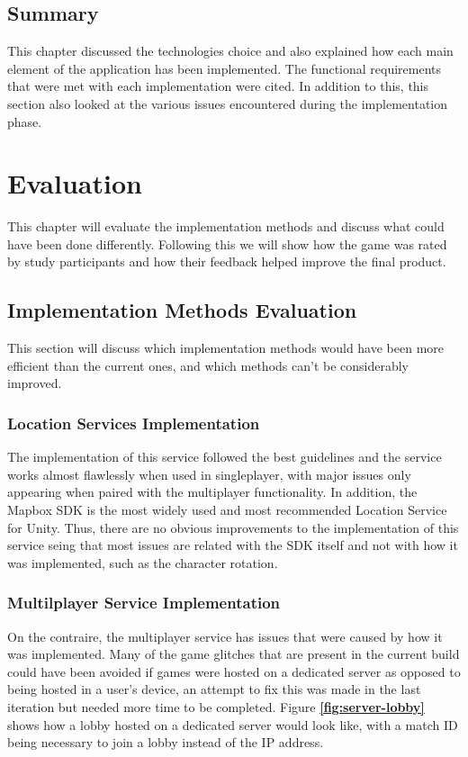 \documentclass{dissertation}
\begin{document}
\section{Summary}
This chapter discussed the technologies choice and also explained how each main element of the application has been implemented. The functional requirements that were met with each implementation were cited. In addition to this, this section also looked at the various issues encountered during the implementation phase.

\chapter{Evaluation}

This chapter will evaluate the implementation methods and discuss what could have been done differently. Following this we will show how the game was rated by study participants and how their feedback helped improve the final product.

\section{Implementation Methods Evaluation}

This section will discuss which implementation methods would have been more efficient than the current ones, and which methods can't be considerably improved.

\subsection{Location Services Implementation}
The implementation of this service followed the best guidelines and the service works almost flawlessly when used in singleplayer, with major issues only appearing when paired with the multiplayer functionality. In addition, the Mapbox SDK is the most widely used and most recommended Location Service for Unity. Thus, there are no obvious improvements to the implementation of this service seing that most issues are related with the SDK itself and not with how it was implemented, such as the character rotation.

\subsection{Multilplayer Service Implementation}
On the contraire, the multiplayer service has issues that were caused by how it was implemented. Many of the game glitches that are present in the current build could have been avoided if games were hosted on a dedicated server as opposed to being hosted in a user's device, an attempt to fix this was made in the last iteration but needed more time to be completed. Figure \textbf{\ref{fig:server-lobby}} shows how a lobby hosted on a dedicated server would look like, with a match ID being necessary to join a lobby instead of the IP address.
\end{document}
